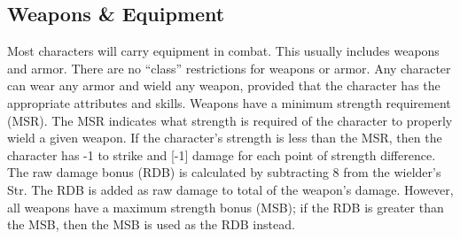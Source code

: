 \documentclass[twoside]{book}
\begin{document}
\subsection{Weapons \& Equipment}
     Most characters will carry equipment in combat. This
               usually includes weapons and armor. There are no
               “class” restrictions for weapons or armor. Any
               character can wear any armor and wield any weapon,
               provided that the character has the appropriate attributes
               and skills.  Weapons have a minimum strength requirement (MSR).
               The MSR indicates what strength is required of the
               character to properly wield a given weapon. If the
               character’s strength is less than the MSR, then the
               character has -1 to strike and [-1] damage for each point
               of strength difference.  The raw damage bonus (RDB) is calculated by
               subtracting 8 from the wielder’s Str. The RDB is
               added as raw damage to total of the weapon’s damage.
               However, all weapons have a maximum strength bonus (MSB);
               if the RDB is greater than the MSB, then the MSB is used
               as the RDB instead. 
  
\end{document}
